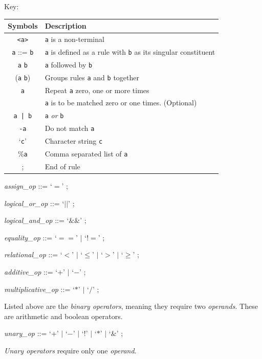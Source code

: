 \documentclass[a4paper,11pt]{article}
\begin{document}
Key:\\
\begin{tabular}{|c|l|}
 \hline
 \textbf{Symbols} & \textbf{Description} \\ \hline
 \verb+<a>+ & \verb+a+ is a non-terminal \\ \hline
 \verb+a+ ::= \verb+b+ & \verb+a+ is defined as a rule with \verb+b+ as its singular constituent \\ \hline
 \verb+a+ \verb+b+ & \verb+a+ followed by \verb+b+ \\ \hline
 (\verb+a+ \verb+b+) & Groups rules \verb+a+ and \verb+b+ together \\ \hline
 {\verb+a+} & Repeat \verb+a+ zero, one or more times \\ \hline
 [\verb+a+] & \verb+a+ is to be matched zero or one times. (Optional) \\ \hline
 \verb+a | b+ & \verb+a+ \textit{or} \verb+b+ \\ \hline
 \verb+-a+ & Do not match \verb+a+ \\ \hline
 `\verb+c+' & Character string \verb+c+ \\ \hline
 \%\verb+a+ & Comma separated list of \verb+a+ \\ \hline
 ; & End of rule \\ \hline
\end{tabular}


\noindent\textit{assign\_op} ::=
    `$=$'
    ;

\noindent\textit{logical\_or\_op} ::=
    `$||$'
    ;

\noindent\textit{logical\_and\_op} ::=
    `$\&\&$'
    ;

\noindent\textit{equality\_op} ::=
    `$==$'
    $|$ `$!=$'
    ;

\noindent\textit{relational\_op} ::=
    `$<$'
    $|$ `$\leq$'
    $|$ `$>$'
    $|$ `$\geq$'
    ;

\noindent\textit{additive\_op} ::=
    `$+$'
    $|$ `$-$'
    ;

\noindent\textit{multiplicative\_op} ::=
    `$*$'
    $|$ `$/$'
    ;

\noindent Listed above are the \textit{binary operators}, meaning they require two \textit{operands}. These are arithmetic and boolean operators.

\noindent\textit{unary\_op} ::=
    `$+$'
    $|$ `$-$'
    $|$ `$!$'
    $|$ `$*$'
    $|$ `$\&$'
    ;

\noindent\textit{Unary operators} require only one \textit{operand}.
\end{document}
